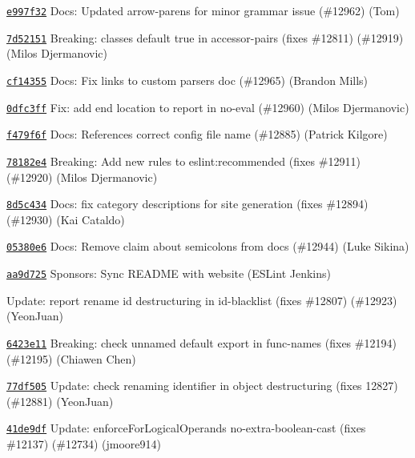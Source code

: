 \begin{DoxyItemize}
\item \href{https://github.com/eslint/eslint/commit/e997f32b936463ac38e8b0034f764c47502e56a8}{\texttt{ {\ttfamily e997f32}}} Docs\+: Updated arrow-\/parens for minor grammar issue (\#12962) (Tom)
\item \href{https://github.com/eslint/eslint/commit/7d52151bcd5d5524f240588436a8808162be187f}{\texttt{ {\ttfamily 7d52151}}} Breaking\+: classes default {\ttfamily true} in accessor-\/pairs (fixes \#12811) (\#12919) (Milos Djermanovic)
\item \href{https://github.com/eslint/eslint/commit/cf14355e34a6757e15806f8e493553bd7110fb36}{\texttt{ {\ttfamily cf14355}}} Docs\+: Fix links to custom parsers doc (\#12965) (Brandon Mills)
\item \href{https://github.com/eslint/eslint/commit/0dfc3ff9fb228e1d9b1df99de50033ce9140ac24}{\texttt{ {\ttfamily 0dfc3ff}}} Fix\+: add end location to report in no-\/eval (\#12960) (Milos Djermanovic)
\item \href{https://github.com/eslint/eslint/commit/f479f6fe2eb95156e22bebfccb39a7fc1f19e9c0}{\texttt{ {\ttfamily f479f6f}}} Docs\+: References correct config file name (\#12885) (Patrick Kilgore)
\item \href{https://github.com/eslint/eslint/commit/78182e45e0178d9eac2591944ef4daee21d2cb44}{\texttt{ {\ttfamily 78182e4}}} Breaking\+: Add new rules to eslint\+:recommended (fixes \#12911) (\#12920) (Milos Djermanovic)
\item \href{https://github.com/eslint/eslint/commit/8d5c434f721142be74c7515aaa935668a15b79b1}{\texttt{ {\ttfamily 8d5c434}}} Docs\+: fix category descriptions for site generation (fixes \#12894) (\#12930) (Kai Cataldo)
\item \href{https://github.com/eslint/eslint/commit/05380e6e7e19a79d26ea6d6b44a8d5ee7cde51c8}{\texttt{ {\ttfamily 05380e6}}} Docs\+: Remove claim about semicolons from docs (\#12944) (Luke Sikina)
\item \href{https://github.com/eslint/eslint/commit/aa9d72525054e641231a2960a2e37b3716228056}{\texttt{ {\ttfamily aa9d725}}} Sponsors\+: Sync README with website (ESLint Jenkins)
\item \href{https://github.com/eslint/eslint/commit/7747177f8504961059b7c56bdb70a820bd1114c1}{\texttt{ {}}} Update\+: report rename id destructuring in id-\/blacklist (fixes \#12807) (\#12923) (Yeon\+Juan)
\item \href{https://github.com/eslint/eslint/commit/6423e11c0bedd3b4e661ab554316bdeb1fc1ee3c}{\texttt{ {\ttfamily 6423e11}}} Breaking\+: check unnamed default export in func-\/names (fixes \#12194) (\#12195) (Chiawen Chen)
\item \href{https://github.com/eslint/eslint/commit/77df505d9a08496a8eaefeca4f885f54a21d5c5e}{\texttt{ {\ttfamily 77df505}}} Update\+: check renaming identifier in object destructuring (fixes 12827) (\#12881) (Yeon\+Juan)
\item \href{https://github.com/eslint/eslint/commit/41de9df41a30a4300243bfe4ca26f716a787b2fc}{\texttt{ {\ttfamily 41de9df}}} Update\+: enforce\+For\+Logical\+Operands no-\/extra-\/boolean-\/cast (fixes \#12137) (\#12734) (jmoore914)
\end{DoxyItemize}

